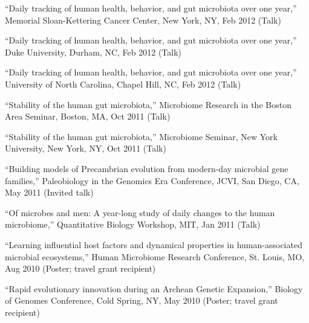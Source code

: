\documentclass[overlapped,line,11pt]{res}
\begin{document}
\begin{resume}
\begin{revnumerate}[43]
\item {``Daily tracking of human health, behavior, and gut microbiota
  over one year,'' Memorial Sloan-Kettering Cancer Center, New York, NY,
  Feb 2012 (Talk)}
\vspace*{0mm}

\item {``Daily tracking of human health, behavior, and gut microbiota
  over one year,'' Duke University, Durham, NC, Feb 2012 (Talk)}
\vspace*{0mm}

\item {``Daily tracking of human health, behavior, and gut microbiota
  over one year,'' University of North Carolina, Chapel Hill, NC, Feb 2012 (Talk)}
\vspace*{0mm}

\item {``Stability of the human gut microbiota,'' Microbiome Research
  in the Boston Area Seminar, Boston, MA, Oct 2011 (Talk)}
\vspace*{0mm}

\item {``Stability of the human gut microbiota,'' Microbiome Seminar,
  New York University, New York, NY, Oct 2011 (Talk)}
\vspace*{0mm}

\item {``Building models of Precambrian evolution from modern-day
  microbial gene families,'' Paleobiology in the Genomics Era
  Conference, JCVI, San Diego, CA, May 2011 (Invited talk)}
\vspace*{0mm}

\item {``Of microbes and men:
A year-long study of daily changes to the human microbiome,''
Quantitative Biology Workshop, MIT, Jan 2011 (Talk)}
\vspace*{0mm}

\item {``Learning influential host factors and dynamical properties in
human-associated microbial ecosystems,'' Human Microbiome Research
Conference, St. Louis, MO, Aug 2010 (Poster; travel grant recipient)}
\vspace*{0mm}

\item {``Rapid evolutionary innovation during an Archean Genetic
  Expansion,'' Biology of Genomes Conference, Cold Spring, NY,
  May 2010 (Poster; travel grant recipient)}
\vspace*{0mm}



\end{revnumerate}
\end{resume}
\end{document}
